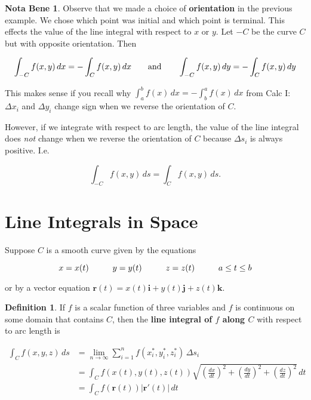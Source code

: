 \documentclass[11pt,oneside,english]{amsart}
\theoremstyle{definition}
\newtheorem*{definition}{Definition}
\newtheorem*{note}{Nota Bene}
\newcommand{\aspace}{\hspace{7mm}\text{and}\hspace{7mm}}
\newcommand{\pspace}{\hspace{10mm}}
\newcommand{\lom}[2]{\lim_{{#1}\rightarrow{#2}}}
\newcommand{\dd}[2]{\frac{d{#1}}{d{#2}}}
\begin{document}
\pagebreak

\begin{note}
Observe that we made a choice of \textbf{orientation} in the previous example. We chose which point was initial and which point is terminal. This effects the value of the line integral with respect to $x$ or $y$. Let $-C$ be the curve $C$ but with opposite orientation. Then

\[
\int_{-C}f(x,y)\,dx=-\int_Cf(x,y)\,dx\aspace \int_{-C}f(x,y)\,dy=-\int_Cf(x,y)\,dy
\] 

This makes sense if you recall why $\int_a^bf(x)\,dx=-\int_b^af(x)\,dx$ from Calc I: $\Delta x_i$ and $\Delta y_i$ change sign when we reverse the orientation of $C$.

However, if we integrate with respect to arc length, the value of the line integral does \textit{not} change when we reverse the orientation of $C$ because $\Delta s_i$ is always positive. I.e.

\[
\int_{-C}f(x,y)\,ds=\int_Cf(x,y)\,ds.
\]
\end{note}



\section*{Line Integrals in Space}


Suppose $C$ is a smooth curve given by the equations

\[
x=x(t)\pspace y=y(t)\pspace z=z(t)\pspace a\leq t\leq b
\]

or by a vector equation $\mathbf{r}(t)=x(t)\mathbf{i}+y(t)\mathbf{j}+z(t)\mathbf{k}$.

\begin{definition}
If $f$ is a scalar function of three variables and $f$ is continuous on some domain that contains $C$, then the \textbf{line integral of $f$ along $C$} with respect to arc length is 

\begin{align*}
\int_Cf(x,y,z)\,ds&=\lom{n}{\infty}\sum_{i=1}^nf(x_i^*,y_i^*,z_i^*)\,\Delta s_i\\[2mm]
&=\int_Cf(x(t),y(t),z(t))\sqrt{\left(\dd{x}{t}\right)^2+\left(\dd{y}{t}\right)^2+\left(\dd{z}{t}\right)^2}\,dt\\[2mm]
&=\int_Cf(\mathbf{r}(t))|\mathbf{r}'(t)|\,dt
\end{align*}
\end{definition}

\pagebreak
\end{document}
